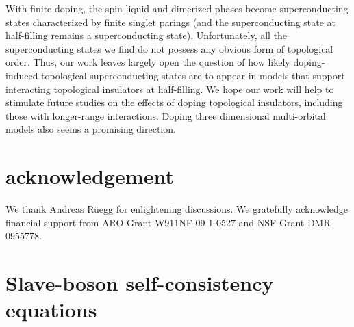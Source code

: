 \documentclass[aps,prb,twocolumn,superscriptaddress,showpacs]{revtex4-1}
\begin{document}
With finite doping, the spin liquid and dimerized phases become superconducting states  characterized by finite singlet parings (and the superconducting state at half-filling remains a superconducting state).  Unfortunately,  all the superconducting states we find do not possess any obvious form of topological order.  Thus, our work leaves largely open the question of how likely doping-induced topological superconducting states are to appear in models that support interacting topological insulators at half-filling.  We hope our work will help to stimulate future studies on the effects of doping topological insulators, including those with longer-range interactions.  Doping three dimensional multi-orbital models also seems a promising direction.\cite{Pesin:np10,Kargarian:prb11}



\section{acknowledgement}
We thank Andreas R\"uegg for enlightening discussions. We gratefully acknowledge financial support from ARO Grant W911NF-09-1-0527 and NSF Grant DMR-0955778.


\appendix
\section{Slave-boson self-consistency equations}
\label{app:formulas}
\end{document}
